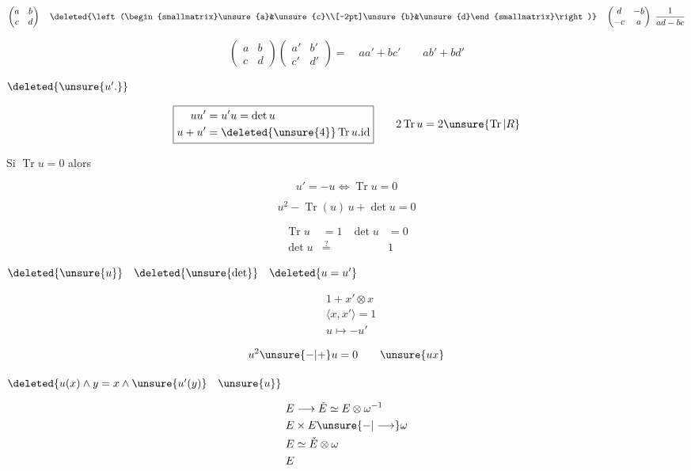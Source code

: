 \[
\begin{pmatrix}a&b\\c&d\end{pmatrix}\quad
\deleted{\left(\begin{smallmatrix}\unsure{a}&\unsure{c}\\[-2pt]\unsure{b}&\unsure{d}\end{smallmatrix}\right)}\quad
\begin{pmatrix}d&-b\\-c&a\end{pmatrix}\ \frac{1}{ad-bc}
\]

\[
\begin{pmatrix}a&b\\c&d\end{pmatrix}
\begin{pmatrix}a'&b'\\c'&d'\end{pmatrix}
=\quad aa'+bc'\qquad ab'+bd'
\]

$\deleted{\unsure{u'.}}$

\[
\boxed{\begin{aligned}uu'&=u'u=\det u\\u+u'&=\deleted{\unsure{4}}\operatorname{Tr}u.\mathrm{id}\end{aligned}}
\qquad 2\operatorname{Tr}u=2\unsure{\operatorname{Tr}|R}
\]

 Si $\operatorname{Tr}u=0$ alors

\[
u'=-u\Longleftrightarrow\operatorname{Tr}u=0
\]

\[
u^2-\operatorname{Tr}(u)\,u+\det u=0
\]

\[
\begin{aligned}
\operatorname{Tr}u&=1&\det u&=0\\
\det u&\overset{?}{=}& &1
\end{aligned}
\]

$\deleted{\unsure{u}}\quad\deleted{\unsure{\det}}\quad\deleted{u=u'}$

\[
\begin{aligned}
&1+x'\otimes x\\
&\langle x,x'\rangle=1\\
&u\mapsto-u'
\end{aligned}
\]

\[
u^2\unsure{-|+}u=0\qquad \unsure{ux}
\]

$\deleted{u(x)\wedge y=x\wedge\unsure{u'(y)}\quad\unsure{u}}$

\[
\begin{aligned}
&E\longrightarrow\check E\simeq E\otimes\omega^{-1}\\
&E\times E\unsure{-|\longrightarrow}\omega\\
&E\simeq\check E\otimes\omega\\
&E
\end{aligned}
\]

